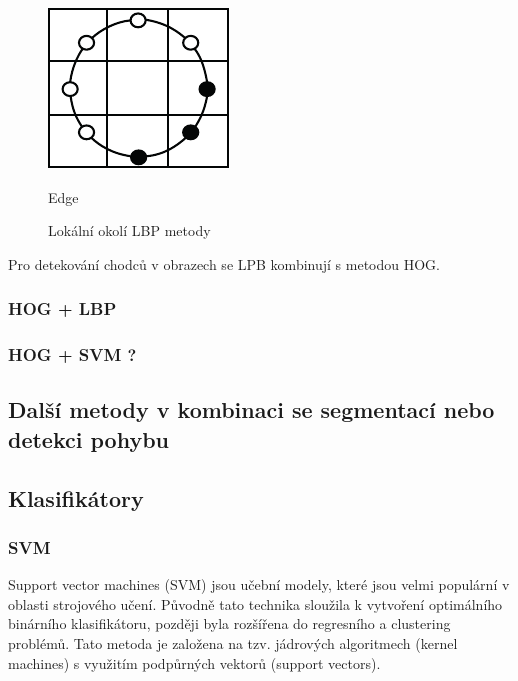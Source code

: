\begin{figure}[H]
\begin{minipage}[b]{.18\textwidth}
  \includegraphics[width=.9\linewidth]{figures/lbp_edge}
  \caption*{Edge}
\end{minipage}
\caption{Lokální okolí LBP metody}
\label{fig:lbpvzory}
\end{figure}

Pro detekování chodců v obrazech se LPB kombinují s metodou HOG. \cite{hoglpb}

\subsubsection*{HOG + LBP}
\subsubsection*{HOG + SVM ? }

\subsection{Další metody v kombinaci se segmentací nebo detekci pohybu} %

\subsection{Klasifikátory}
\subsubsection*{SVM} %
Support vector machines (SVM) jsou učební modely, které jsou velmi populární v oblasti strojového učení. Původně tato technika sloužila k vytvoření optimálního binárního klasifikátoru, později byla rozšířena do regresního a clustering problémů. Tato metoda je založena na tzv. jádrových algoritmech (kernel machines) s využitím podpůrných vektorů (support vectors).

